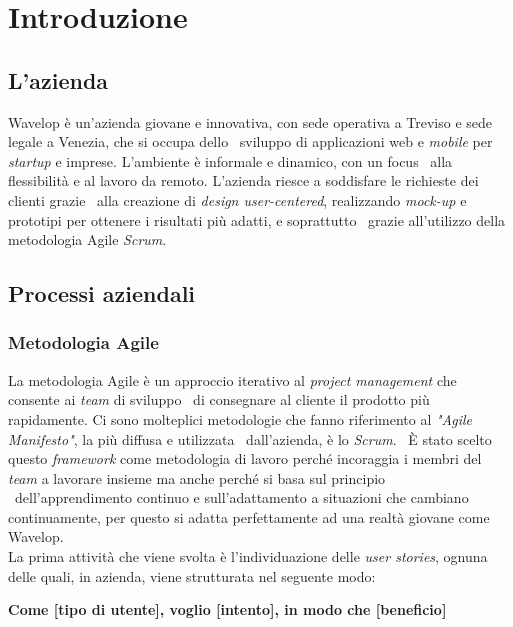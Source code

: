 
\chapter{Introduzione}
\label{cap:intro}
\section{L'azienda}
Wavelop è un'azienda giovane e innovativa, con sede operativa a Treviso e sede legale a Venezia, che si occupa dello \
sviluppo di applicazioni web e \emph{mobile} per \emph{startup} e imprese. L'ambiente è informale e dinamico, con un focus \
alla flessibilità e al lavoro da remoto. L'azienda riesce a soddisfare le richieste dei clienti grazie \
alla creazione di \emph{design user-centered}, realizzando \emph{\gls{mock-up}} e prototipi per ottenere i risultati più adatti, e soprattutto \
grazie all'utilizzo della metodologia Agile \emph{Scrum}.

\section{Processi aziendali}

\subsection{Metodologia Agile}
La metodologia Agile è un approccio iterativo al \emph{project management} che consente ai \emph{team} di sviluppo \
di consegnare al cliente il prodotto più rapidamente. Ci sono molteplici metodologie che fanno riferimento al \emph{"Agile Manifesto"}, la più diffusa e utilizzata \
dall'azienda, è lo \emph{Scrum}. \
È stato scelto questo \emph{framework} come metodologia di lavoro perché incoraggia i membri del \emph{team} a lavorare insieme ma anche perché si basa sul principio \
dell'apprendimento continuo e sull'adattamento a situazioni che cambiano continuamente, per questo si adatta perfettamente ad una realtà giovane come Wavelop. \\

La prima attività che viene svolta è l'individuazione delle \emph{user stories}, ognuna delle quali, in azienda, viene strutturata nel seguente modo:
\begin{center}
  \textbf{Come [tipo di utente], voglio [intento], in modo che [beneficio]}
\end{center}

